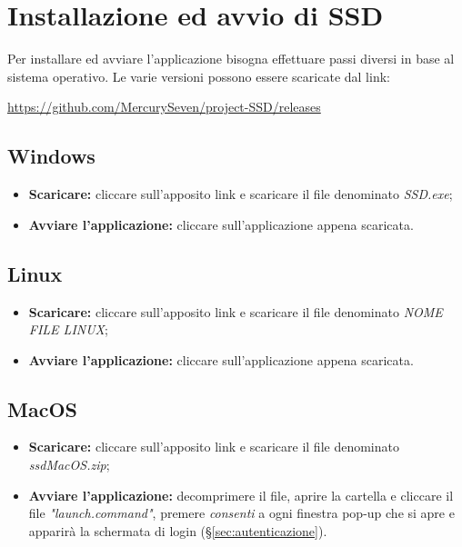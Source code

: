 \section{Installazione ed avvio di SSD}
Per installare ed avviare l'applicazione  bisogna effettuare passi diversi in base al sistema operativo. Le varie versioni possono essere scaricate dal link: \newline{}
\centerline{\url{https://github.com/MercurySeven/project-SSD/releases}}

\subsection{Windows}
\begin{itemize}
\item \textbf{Scaricare:} cliccare sull'apposito link e scaricare il file  denominato \textit{SSD.exe};
\item \textbf{Avviare l'applicazione:} cliccare sull'applicazione appena scaricata.
\end{itemize}

\subsection{Linux}
\begin{itemize}
\item \textbf{Scaricare:} cliccare sull'apposito link e scaricare il file  denominato \textit{NOME FILE LINUX};
\item \textbf{Avviare l'applicazione:} cliccare sull'applicazione appena scaricata.
\end{itemize}

\subsection{MacOS}
\begin{itemize}
\item \textbf{Scaricare:} cliccare sull'apposito link e scaricare il file  denominato \textit{ssdMacOS.zip};
\item \textbf{Avviare l'applicazione:} decomprimere il file, aprire la cartella e cliccare il file \textit{"launch.command"}, premere \textit{consenti} a ogni finestra pop-up che si apre e apparirà la schermata di login (\S{}\ref{sec:autenticazione}).
\end{itemize}

